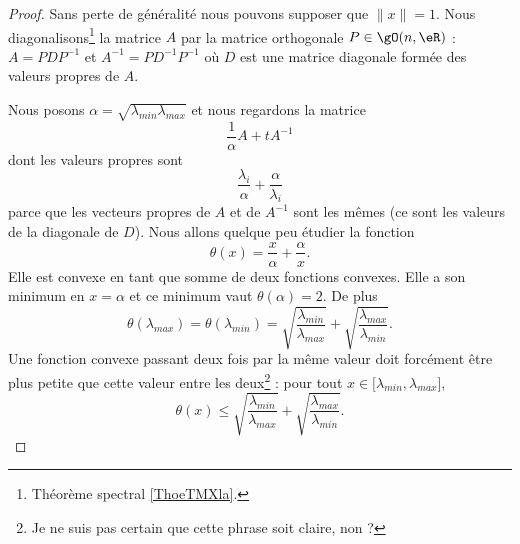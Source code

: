\begin{proof}
    Sans perte de généralité nous pouvons supposer que \( \| x \|=1\). Nous diagonalisons\footnote{Théorème spectral \ref{ThoeTMXla}.} la matrice \( A\) par la matrice orthogonale  \( P\in\gO(n,\eR)\) : \( A=PDP^{-1}\) et \( A^{-1}=PD^{-1}P^{-1}\) où \( D\) est  une matrice diagonale formée des valeurs propres de \( A\).

    Nous posons \( \alpha=\sqrt{\lambda_{min}\lambda_{max}}\) et nous regardons la matrice
    \begin{equation}
        \frac{1}{ \alpha }A+tA^{-1}
    \end{equation}
    dont les valeurs propres sont
    \begin{equation}
        \frac{ \lambda_i }{ \alpha }+\frac{ \alpha }{ \lambda_i }
    \end{equation}
    parce que les vecteurs propres de \( A\) et de \( A^{-1}\) sont les mêmes (ce sont les valeurs de la diagonale de \( D\)). Nous allons quelque peu étudier la fonction
    \begin{equation}
        \theta(x)=\frac{ x }{ \alpha }+\frac{ \alpha }{ x }.
    \end{equation}
    Elle est convexe en tant que somme de deux fonctions convexes. Elle a son minimum en \( x=\alpha\) et ce minimum vaut \( \theta(\alpha)=2\). De plus
    \begin{equation}
        \theta(\lambda_{max})=\theta(\lambda_{min})=\sqrt{\frac{ \lambda_{min} }{ \lambda_{max} }}+\sqrt{\frac{ \lambda_{max} }{ \lambda_{min} }}.
    \end{equation}
    Une fonction convexe passant deux fois par la même valeur doit forcément être plus petite que cette valeur entre les deux\footnote{Je ne suis pas certain que cette phrase soit claire, non ?} : pour tout \( x\in\mathopen[ \lambda_{min} , \lambda_{max} \mathclose]\),
    \begin{equation}
        \theta(x)\leq  \sqrt{\frac{ \lambda_{min} }{ \lambda_{max} }}+\sqrt{\frac{ \lambda_{max} }{ \lambda_{min} }}.
    \end{equation}
    

\end{proof}
